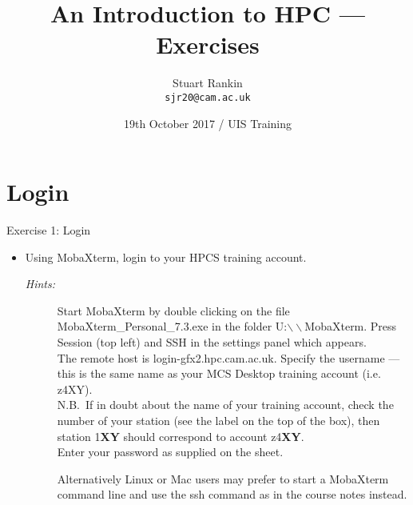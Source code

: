 \documentclass{beamer}
\title[HPC: An introduction --- Exercises] %
{An Introduction to HPC --- Exercises}
\author[SJ Rankin] %
{Stuart Rankin\\ \texttt{sjr20@cam.ac.uk}}
\institute[HPCS, University of Cambridge] %
{Research Computing Services (http://www.hpc.cam.ac.uk/)\\
University Information Services (http://www.uis.cam.ac.uk/)}
\date[19/10/2017] %
{19th October 2017 / UIS Training}
\begin{document}
\begin{frame}
  \titlepage
\end{frame}

\section{Login}
\begin{frame}{Exercise 1: Login}
\begin{itemize}
\item{Using MobaXterm, login to your HPCS training account.}
\begin{description}
\item[\emph{Hints:}]{\small Start MobaXterm by double clicking on the file \alert{MobaXterm\_Personal\_7.3.exe} in the folder U:$\backslash\backslash$MobaXterm. Press \alert{Session} (top left) and \alert{SSH} in the settings panel which appears.\\\smallskip
The remote host is \alert{login-gfx2.hpc.cam.ac.uk}. Specify the username --- this is the same name as your MCS Desktop training account (i.e. \alert{z4XY}).\hfill\\\smallskip
{\scriptsize N.B.\ If in doubt about the name of your training account, check the number of your station (see the label on the top of the box), then station 1\textbf{XY} should correspond to account z4\textbf {XY}.}\hfill\\\smallskip
Enter your password as supplied on the sheet.

{\color{orange}Alternatively Linux or Mac users may prefer to start a MobaXterm command line and use the ssh command as in the course notes instead.}}
\end{description}
\end{itemize}
\end{frame}
\end{document}
